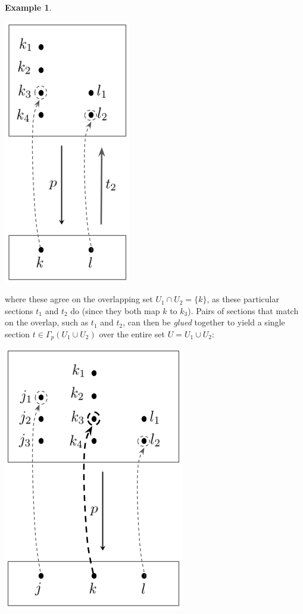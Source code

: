\documentclass[a4paper]{book}
\theoremstyle{definition}
\newtheorem{example}{Example}[section]
\theoremstyle{definition}
\theoremstyle{definition}
\theoremstyle{theorem}
\theoremstyle{definition}
\begin{document}
\begin{example}
\begin{center}
		\includegraphics*[scale=0.3]{ShortSec2.png}
	\end{center}
	where these agree on the overlapping set $U_1 \cap U_2 = \{k\}$, as these particular sections $t_1$ and $t_2$ do (since they both map $k$ to $k_3$). Pairs of sections that match on the overlap, such as $t_1$ and $t_2$, can then be \textit{glued} together to yield a single section $t \in \Gamma_p(U_1 \cup U_2)$ over the entire set $U = U_1 \cup U_2$: 
	\begin{center}
		\includegraphics*[scale=0.3]{GluedSection.png}

\end{center}
\end{example}
\end{document}
